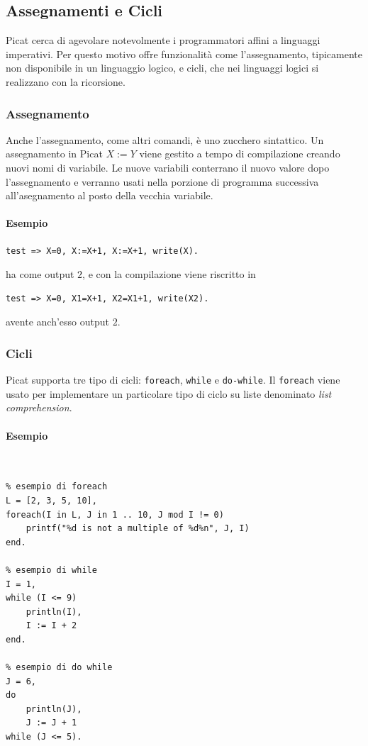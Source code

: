 \documentclass[12pt,a4paper,openright]{book} %
\begin{document}
\subsection{Assegnamenti e Cicli}
\label{sec:picat_base_asscycle}

Picat cerca di agevolare notevolmente i programmatori affini a linguaggi imperativi. Per questo motivo offre funzionalità come l'assegnamento, tipicamente non disponibile in un linguaggio logico,
e cicli, che nei linguaggi logici si realizzano con la ricorsione.

\subsubsection{Assegnamento}

Anche l'assegnamento, come altri comandi, è uno zucchero sintattico. Un assegnamento in Picat $X := Y$ viene gestito a tempo di compilazione creando nuovi nomi di variabile. Le nuove variabili conterrano il nuovo valore dopo l'assegnamento e verranno usati nella porzione di programma successiva all'asegnamento al posto della vecchia variabile.

\paragraph{Esempio}
\begin{verbatim}
test => X=0, X:=X+1, X:=X+1, write(X).
\end{verbatim}
ha come output $2$, e con la compilazione viene riscritto in
\begin{verbatim}
test => X=0, X1=X+1, X2=X1+1, write(X2).
\end{verbatim}
avente anch'esso output $2$.

\subsubsection{Cicli}

Picat supporta tre tipo di cicli: \verb|foreach|, \verb|while| e \verb|do-while|. Il \verb|foreach| viene usato per implementare un particolare tipo di ciclo su liste denominato \emph{list comprehension}.

\paragraph{Esempio}\
\begin{lstlisting}
% esempio di foreach
L = [2, 3, 5, 10],
foreach(I in L, J in 1 .. 10, J mod I != 0)
	printf("%d is not a multiple of %d%n", J, I)
end.

% esempio di while
I = 1,
while (I <= 9)
	println(I),
	I := I + 2
end.

% esempio di do while
J = 6,
do
	println(J),
	J := J + 1
while (J <= 5).
\end{lstlisting}
\end{document}

